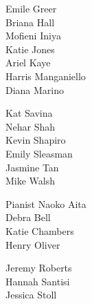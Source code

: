 \documentclass{article}[10pt]
\begin{document}
\begin{center}
\begin{multicols}{3}
\begin{center}
\begin{small}
{Emile Greer}\\
{Briana Hall}\\
{Mofieni Iniya}\\
{Katie Jones}\\
{Ariel Kaye}\\
{Harris Manganiello}\\
{Diana Marino}\null
\columnbreak

{Kat Savina}\\
{Nehar Shah}\\
{Kevin Shapiro}\\
{Emily Sleasman}\\
{Jasmine Tan}\\
{Mike Walsh}
                \end{small}
            \end{center}
        \end{multicols}

        \begin{center}
            \begin{minipage}{3.5in}
                \vspace{-0.1in}
                \begin{multicols}{2}
                    \begin{center}
                        \begin{small}
                            {Pianist Naoko Aita}\\
{Debra Bell}\\
{Katie Chambers}\\
{Henry Oliver}\null
\columnbreak

{Jeremy Roberts}\\
{Hannah Santisi}\\
{Jessica Stoll}
                        \end{small}
                    \end{center}
                \end{multicols}
            \end{minipage}
        \end{center}

    \end{center}
    \vfill

    \pagebreak

\end{document}

